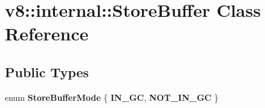 \hypertarget{classv8_1_1internal_1_1StoreBuffer}{}\section{v8\+:\+:internal\+:\+:Store\+Buffer Class Reference}
\label{classv8_1_1internal_1_1StoreBuffer}
\subsection*{Public Types}
\begin{DoxyCompactItemize}
\item 
\mbox{\label{classv8_1_1internal_1_1StoreBuffer_a4acfb4f1244d8ee720992b6a815cbdb3}} 
enum {\bfseries Store\+Buffer\+Mode} \{ {\bfseries I\+N\+\_\+\+GC}, 
{\bfseries N\+O\+T\+\_\+\+I\+N\+\_\+\+GC}
 \}
\end{DoxyCompactItemize}

